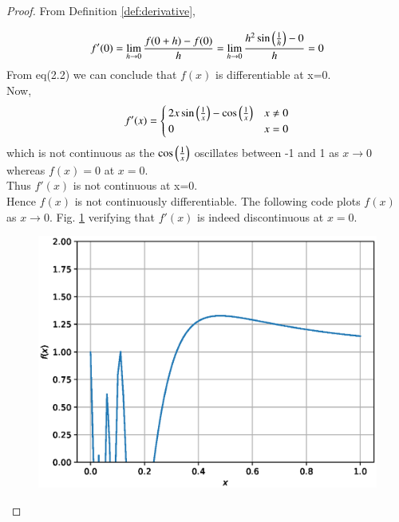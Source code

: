 \documentclass[journal,12pt,twocolumn]{IEEEtran}
\begin{document}
\begin{proof}
From Definition \ref{def:derivative},

\begin{align}
f'(0)=\lim_{h \to 0} {\frac {f(0+h)-f(0)}{h}}=\lim_{h \to 0} {\frac{h^2\sin\left(\frac{1}{h}\right)-0}{h}}=0
\end{align}
From eq(2.2) we can conclude that $f(x)$ is differentiable at x=0.\\
Now,
\begin{equation}
f'(x)=
 \begin{cases} 
      2x\sin\left(\frac{1}{x}\right)-\cos\left(\frac{1}{x}\right) & x \neq 0\\
      0 & x=0  
   \end{cases}
\end{equation}
which is  not continuous as the $\cos\left(\frac{1}{x}\right)$ oscillates between -1 and 1 as $x\to 0$ whereas $f(x)=0$ at $x=0$.\\
Thus $f'(x)$ is not continuous at x=0.\\
Hence $f(x)$ is not continuously differentiable.
The following code plots $f(x)$ as $x \to 0$. Fig. \ref{fig:2} verifying that $f'(x)$ is indeed discontinuous at $x=0$.

%
\begin{figure}[!ht]
\begin{center}
\includegraphics[width=\columnwidth]{./figs/2.eps}
\end{center}
\label{fig:2}	
\end{figure}
\end{proof}
\end{document}
